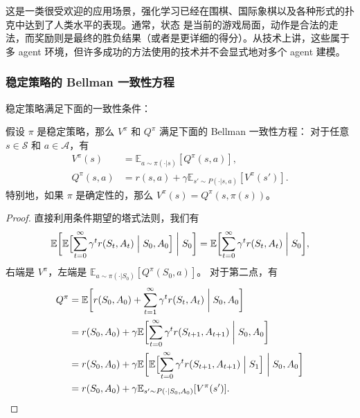 \documentclass[fontset=none,zihao=-4]{Notes}
\begin{document}
\begin{example}[策略游戏]
  这是一类很受欢迎的应用场景，强化学习已经在围棋、国际象棋以及各种形式的扑克中达到了人类水平的表现。通常，状态
  是当前的游戏局面，动作是合法的走法，而奖励则是最终的胜负结果（或者是更详细的得分）。从技术上讲，这些属于
  多 agent 环境，但许多成功的方法使用的技术并不会显式地对多个 agent 建模。
\end{example}

\subsubsection{稳定策略的 Bellman 一致性方程}

稳定策略满足下面的一致性条件：

\begin{lemma}
  假设 $\pi$ 是稳定策略，那么 $V^\pi$ 和 $Q^\pi$ 满足下面的 Bellman 一致性方程：
  对于任意 $s\in \mathcal S$ 和 $a\in \mathcal A$，有
  \begin{align*}
    V^\pi(s)&=\mathbb{E}_{a\sim \pi(\cdot|s)} [Q^\pi(s,a)],\\
    Q^\pi(s,a) &= r(s,a) + \gamma \mathbb{E}_{s'\sim P(\cdot|s,a)} [V^\pi(s')].
  \end{align*}
  特别地，如果 $\pi$ 是确定性的，那么 $V^\pi(s)=Q^\pi(s,\pi(s))$。
\end{lemma}
\begin{proof}
  直接利用条件期望的塔式法则，我们有
  \begin{equation*}
    \mathbb{E}\biggl[
      \mathbb{E}\Bigl[
        \sum_{t=0}^\infty \gamma^t r(S_t,A_t)\Bigm| S_0,A_0
      \Bigr]\biggm| S_0
    \biggr]= \mathbb{E}\biggl[
      \sum_{t=0}^\infty \gamma^t r(S_t,A_t) \biggm| S_0
      \biggr],
  \end{equation*}
  右端是 $V^\pi$，左端是 $\mathbb{E}_{a\sim \pi(\cdot|S_0)}[Q^\pi(S_0,a)]$。
  对于第二点，有
  \begin{align*}
    Q^\pi&=\mathbb{E}\biggl[
      r(S_0,A_0) + \sum_{t=1}^\infty \gamma^t r(S_t,A_t) \biggm| S_0,A_0
    \biggr]\\
    &=r(S_0,A_0)+\gamma \mathbb{E}\biggl[
      \sum_{t=0}^\infty \gamma^t r(S_{t+1},A_{t+1}) \biggm| S_0,A_0
    \biggr]\\
    &= r(S_0,A_0) + \gamma \mathbb{E}\biggl[
      \mathbb{E}\Bigl[
        \sum_{t=0}^\infty \gamma^t r(S_{t+1},A_{t+1}) \Bigm| S_1
      \Bigr] \biggm| S_0,A_0
    \biggr]\\
    &= r(S_0,A_0) + \gamma \mathbb{E}_{s'\sim P(\cdot|S_0,A_0)}[V^\pi(s')].\qedhere
  \end{align*}
\end{proof}
\end{document}
